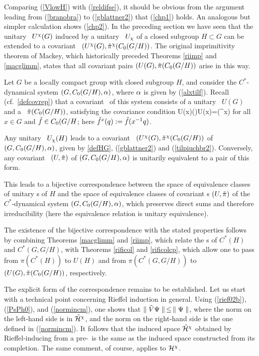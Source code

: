 Comparing (\ref{VlowH}) with (\ref{reldifse}), it should be obvious from the argument
leading from (\ref{branobra}) to (\ref{gblattner2}) that (\ref{chp1}) holds.
 An analogous but simpler calculation shows (\ref{chp2}). \enp
{}
In the preceding section we have seen that the unitary \rep\ $U^{\chi}(G)$ induced by
a unitary \rep\ $U_{\chi}$ of a closed subgroup $H\subset G$ can be extended to a covariant
\rep\ $(U^{\chi}(G),\tilde{\pi}^{\chi}(C_0(G/H))$. The original imprimitivity theorem of Mackey,
which historically preceded Theorems \ref{riimp} and \ref{macglimm}, states that all
covariant pairs $(U(G),\tilde{\pi}(C_0(G/H))$ arise in this way.
\begin{Theorem}
Let $G$ be a locally compact group with closed subgroup $H$, and
consider the $C^*$-dynamical system $(G,C_0(G/H),\alpha)$, where $\alpha$ is
given by (\ref{alxtilf}).  Recall (cf.\ \ref{defcovrep}) that a
covariant \rep\ of this system consists of a unitary \rep\ $U(G)$ and
a \rep\ $\tilde{\pi}(C_0(G/H))$, satisfying the covariance condition \be
U(x)\til{\pi}()U(x)\inv=\til{\pi}(^x) 
\ee for all $x\in
G$ and $\tilde{f}\in C_0(G/H$; here $\tilde{f}^x(q):=\tilde{f}(x^{-1} q)$.

Any   unitary \rep\ $U_{\chi}(H)$ leads to a covariant \rep\
$(U^{\chi}(G),\tilde{\pi}^{\chi}(C_0(G/H))$ of $(G,C_0(G/H),\alpha)$, given by
\ref{defHG}, (\ref{gblattner2}) and (\ref{tilpiuchbr2}).
 Conversely, any
 covariant \rep\ $(U,\tilde{\pi})$ of $(G,C_0(G/H),\alpha)$ is unitarily equivalent
to a pair of this form. 

This leads to  a bijective correspondence between the space of equivalence classes
of unitary \rep s of $H$ and the space of equivalence classes
of covariant \rep s $(U,\tilde{\pi})$ of  the $C^*$-dynamical
system $(G,C_0(G/H),\alpha)$, which preserves direct sums and therefore irreducibility
(here the equivalence relation is unitary equivalence).
\end{Theorem}

The existence of the bijective correspondence with the stated
properties follows by combining Theorems \ref{macglimm} and
\ref{riimp}, which relate the \rep s of $C^*(H)$ and $C^*(G,G/H)$,
with Theorems \ref{rificol} and \ref{rificolcp}, which allow one to
pass from $\pi(C^*(H))$ to $U(H)$ and from $\pi(C^*(G,G/H))$ to
$(U(G),\tilde{\pi}(C_0(G/H))$, respectively.

The explicit form of the correspondence remains to be established.
Let us start with a technical point concerning Rieffel induction in general.
Using  (\ref{rief02b}), (\ref{PsPh0}),
and (\ref{normincm}), one shows that $\parallel\tilde{V}\Psi\parallel\,\leq\,\parallel\Psi\parallel$,
where the  norm on the left-hand side is in $\tilde{{\cal H}}^{\chi}$,
and the norm on the right-hand side is the one defined in (\ref{normincm}).
It follows that the induced space  $\tilde{{\cal H}}^{\chi}$ obtained
by Rieffel-inducing from a pre-\HCM\ is the same as the induced space
constructed  from its completion. The same comment, of course,
applies to ${\cal H}^{\chi}$.

